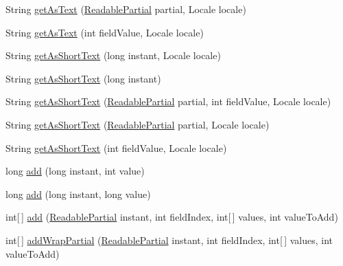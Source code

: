\begin{DoxyCompactItemize}
\item 
String \hyperlink{classorg_1_1joda_1_1time_1_1field_1_1_delegated_date_time_field_a03f2e2c507c997179c12183ebc758de0}{get\-As\-Text} (\hyperlink{interfaceorg_1_1joda_1_1time_1_1_readable_partial}{Readable\-Partial} partial, Locale locale)
\item 
String \hyperlink{classorg_1_1joda_1_1time_1_1field_1_1_delegated_date_time_field_a459954cf8c9cbb5e9096172ba514a3d0}{get\-As\-Text} (int field\-Value, Locale locale)
\item 
String \hyperlink{classorg_1_1joda_1_1time_1_1field_1_1_delegated_date_time_field_a76a22d44cc6549e4bb0e763669a44db5}{get\-As\-Short\-Text} (long instant, Locale locale)
\item 
String \hyperlink{classorg_1_1joda_1_1time_1_1field_1_1_delegated_date_time_field_add425105a087daef7341975ad02091ea}{get\-As\-Short\-Text} (long instant)
\item 
String \hyperlink{classorg_1_1joda_1_1time_1_1field_1_1_delegated_date_time_field_a28bea857d1d4c63136b48f9f0b668259}{get\-As\-Short\-Text} (\hyperlink{interfaceorg_1_1joda_1_1time_1_1_readable_partial}{Readable\-Partial} partial, int field\-Value, Locale locale)
\item 
String \hyperlink{classorg_1_1joda_1_1time_1_1field_1_1_delegated_date_time_field_a3352de939f7bef20123a0bfb0b122b6f}{get\-As\-Short\-Text} (\hyperlink{interfaceorg_1_1joda_1_1time_1_1_readable_partial}{Readable\-Partial} partial, Locale locale)
\item 
String \hyperlink{classorg_1_1joda_1_1time_1_1field_1_1_delegated_date_time_field_abec5e02d853185d2cdeec5a7b24bb9d9}{get\-As\-Short\-Text} (int field\-Value, Locale locale)
\item 
long \hyperlink{classorg_1_1joda_1_1time_1_1field_1_1_delegated_date_time_field_ac66b41b6f4093df1303808d8ba32edcf}{add} (long instant, int value)
\item 
long \hyperlink{classorg_1_1joda_1_1time_1_1field_1_1_delegated_date_time_field_a45ec54e06b67bfd551f0243937d0a7f8}{add} (long instant, long value)
\item 
int\mbox{[}$\,$\mbox{]} \hyperlink{classorg_1_1joda_1_1time_1_1field_1_1_delegated_date_time_field_ab314f426eb9aa2f8fb8c97dcbcd8e7e9}{add} (\hyperlink{interfaceorg_1_1joda_1_1time_1_1_readable_partial}{Readable\-Partial} instant, int field\-Index, int\mbox{[}$\,$\mbox{]} values, int value\-To\-Add)
\item 
int\mbox{[}$\,$\mbox{]} \hyperlink{classorg_1_1joda_1_1time_1_1field_1_1_delegated_date_time_field_af613ba07ea7666854dc5cede6eba969d}{add\-Wrap\-Partial} (\hyperlink{interfaceorg_1_1joda_1_1time_1_1_readable_partial}{Readable\-Partial} instant, int field\-Index, int\mbox{[}$\,$\mbox{]} values, int value\-To\-Add)

\end{DoxyCompactItemize}
